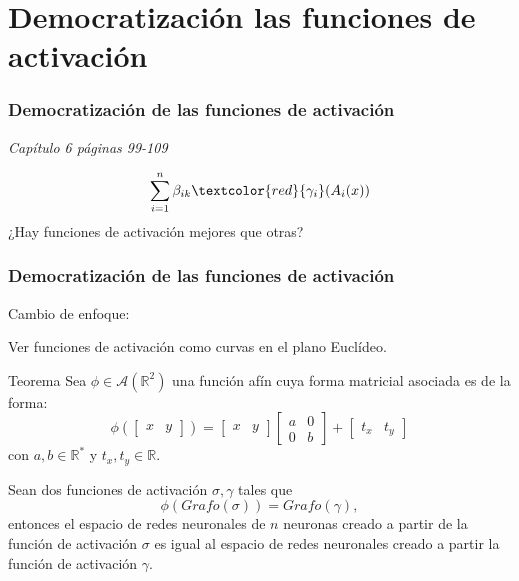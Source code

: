 \documentclass{beamer}
\newcommand{\R}{\mathbb{R}}
\begin{document}
\section{Democratización las funciones de activación} 
\begin{frame}
    \frametitle{Democratización de las funciones de activación}
    \begin{flushright}
        \textit{Capítulo 6 páginas 99-109}
    \end{flushright}
    \begin{equation*}
        \sum_{i=1}^{n} \beta_{i k} \textcolor{red}{\gamma_{i}}( A_{i}(x))
    \end{equation*}
    ¿Hay funciones de activación mejores que otras?
\end{frame}
\begin{frame}
    \frametitle{Democratización de las funciones de activación}
    Cambio de enfoque: 

    Ver funciones de activación como curvas en el plano Euclídeo.  

    \begin{exampleblock}{Teorema}
        Sea $\phi \in \mathcal{A}(\R^2)$ una función afín 
        cuya forma matricial asociada es de la forma:  
        \begin{equation*}
            \phi 
            \left( 
                \begin{bmatrix}
                    x & y
                \end{bmatrix}
            \right)
            = 
            \begin{bmatrix}
                x & y
            \end{bmatrix}
            \begin{bmatrix}
                a & 0 \\
                 0& b 
            \end{bmatrix}
            +
            \begin{bmatrix}
                t_x & t_y
            \end{bmatrix}
        \end{equation*}
        con $a,b \in \R^*$ y $t_x, t_y \in \R$.
    
        Sean dos funciones de activación $\sigma, \gamma$ tales que 
        \begin{equation*}
            \phi(Grafo(\sigma)) = Grafo(\gamma),
        \end{equation*}
        entonces 
        el espacio de redes neuronales de $n$ neuronas creado a partir de la función de activación $\sigma$ es  
        igual al espacio de redes neuronales creado a partir la función de activación $\gamma$. 
    \end{exampleblock}
\end{frame}
\end{document}
